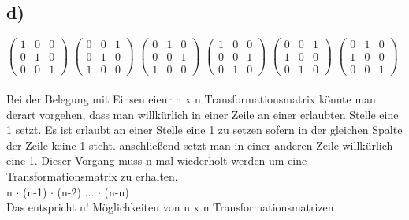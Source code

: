 \documentclass{article}
\begin{document}
	\subsection*{d)}
	$\left(
	\begin{array}{ccc}
	1 & 0& 0\\0 &1&0 \\ 0&0&1
	\end{array}
	\right)$
	$\left(
	\begin{array}{ccc}
	0 & 0& 1\\0 &1&0 \\ 1&0&0
	\end{array}
	\right)$
	$\left(
	\begin{array}{ccc}
	0 & 1& 0\\0 &0&1 \\ 1&0&0
	\end{array}
	\right)$
	$\left(
	\begin{array}{ccc}
	1 & 0& 0\\0 &0&1 \\ 0&1&0
	\end{array}
	\right)$
	$\left(
	\begin{array}{ccc}
	0 & 0& 1\\1 &0&0 \\ 0&1&0
	\end{array}
	\right)$
	$\left(
	\begin{array}{ccc}
	0 & 1& 0\\1 &0&0 \\ 0&0&1
	\end{array}
	\right)$ \\ \\
	Bei der Belegung mit Einsen eienr n x n Transformationsmatrix könnte man derart vorgehen, dass man willkürlich in einer Zeile an einer erlaubten Stelle eine 1 setzt. Es ist erlaubt an einer Stelle eine 1 zu setzen sofern in der gleichen Spalte der Zeile keine 1 steht. anschließend setzt man in einer anderen Zeile willkürlich eine 1. Dieser Vorgang muss n-mal wiederholt werden um eine Transformationsmatrix zu erhalten. \\
	n $\cdot$ (n-1) $\cdot$ (n-2) ... $\cdot$ (n-n) \\
	Das entspricht n! Möglichkeiten von n x n Transformationsmatrizen
\end{document}
